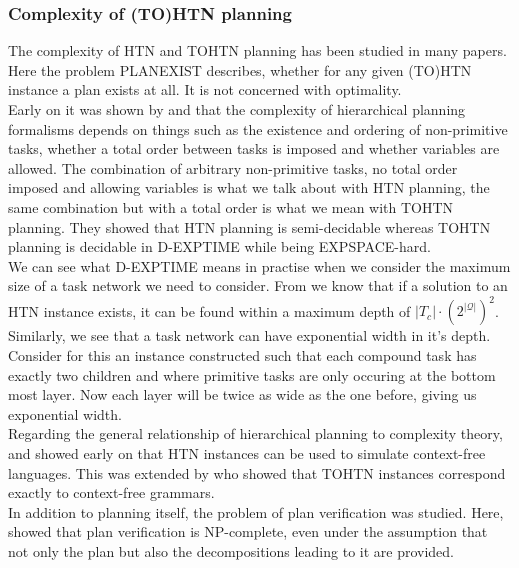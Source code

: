 \subsubsection{Complexity of (TO)HTN planning}
\label{prelim: tohtn complexity}
The complexity of HTN and TOHTN planning has been studied in many papers. Here the problem PLANEXIST describes, whether for any given (TO)HTN instance a plan exists at all. It is not concerned with optimality. \\
Early on it was shown by \cite{erol1994htn} and \cite{erol1996complexity} that the complexity of hierarchical planning formalisms depends on things such as the existence and ordering of non-primitive tasks, whether a total order between tasks is imposed and whether variables are allowed. The combination of arbitrary non-primitive tasks, no total order imposed and allowing variables is what we talk about with HTN planning, the same combination but with a total order is what we mean with TOHTN planning. They showed that HTN planning is semi-decidable whereas TOHTN planning is decidable in D-EXPTIME while being EXPSPACE-hard. \\
We can see what D-EXPTIME means in practise when we consider the maximum size of a task network we need to consider. From \cite{behnke2018totsat} we know that if a solution to an HTN instance exists, it can be found within a maximum depth of $|T_c| \cdot(2 ^{|\mathcal{Q}|})^2$. Similarly, we see that a task network can have exponential width in it's depth. Consider for this an instance constructed such that each compound task has exactly two children and where primitive tasks are only occuring at the bottom most layer. Now each layer will be twice as wide as the one before, giving us exponential width. \\
Regarding the general relationship of hierarchical planning to complexity theory, \cite{erol1994htn} and \cite{erol1996complexity} showed early on that HTN instances can be used to simulate context-free languages. This was extended by \cite{holler2014language} who showed that TOHTN instances correspond exactly to context-free grammars. \\
In addition to planning itself, the problem of plan verification was studied. Here, \cite{behnke2015complexity} showed that plan verification is NP-complete, even under the assumption that not only the plan but also the decompositions leading to it are provided.

